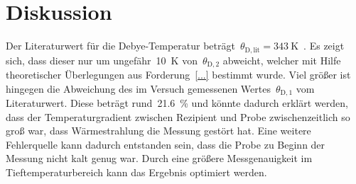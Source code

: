 \section{Diskussion}
\label{sec:diskussion}
%
Der Literaturwert für die Debye-Temperatur beträgt~$\theta_{\mathrm{D,lit}}=\SI{343}{\kelvin}$~\cite{kittel}.
Es zeigt sich, dass dieser nur um ungefähr~\SI{10}{\kelvin} von~$\theta_{\mathrm{D,2}}$ abweicht, welcher mit Hilfe theoretischer Überlegungen aus Forderung~\eqref{...} bestimmt wurde.
Viel größer ist hingegen die Abweichung des im Versuch gemessenen Wertes~$\theta_{\mathrm{D,1}}$ vom Literaturwert.
Diese beträgt rund~\SI{21.6}{\percent} und könnte dadurch erklärt werden, dass der Temperaturgradient zwischen Rezipient und Probe zwischenzeitlich so groß war, dass Wärmestrahlung die Messung gestört hat.
Eine weitere Fehlerquelle kann dadurch entstanden sein, dass die Probe zu Beginn der Messung nicht kalt genug war.
Durch eine größere Messgenauigkeit im Tieftemperaturbereich kann das Ergebnis optimiert werden.
